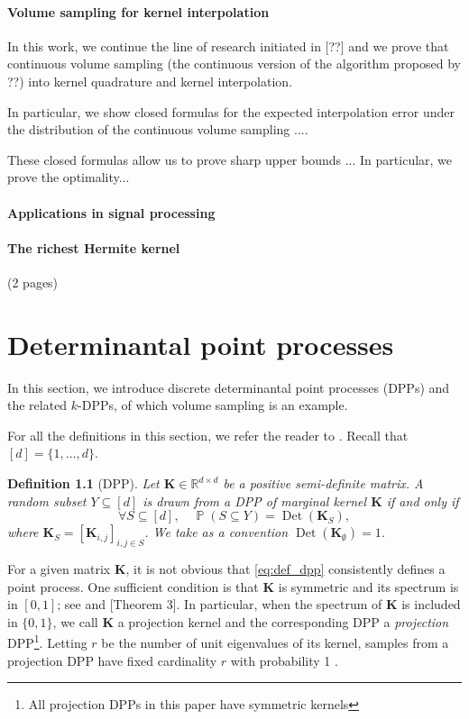\documentclass[twoside,11pt]{book}
\newtheorem{definition}{Definition}
\DeclareMathOperator{\Det}{Det}
\DeclareMathOperator{\Prb}{\mathbb{P}}
\begin{document}
\subsubsection{Volume sampling for kernel interpolation}
In this work, we continue the line of research initiated in [??] and we prove that continuous volume sampling (the continuous version of the algorithm proposed by ??) into kernel quadrature and kernel interpolation.

In particular, we show closed formulas for the expected interpolation error under the distribution of the continuous volume sampling ....

These closed formulas allow us to prove sharp upper bounds ... In particular, we prove the optimality...

\subsubsection{Applications in signal processing}
\subsubsection{The richest Hermite kernel}
(2 pages)

\clearpage
\chapter{Determinantal point processes}

In this section, we introduce discrete determinantal point processes (DPPs) and the related $k$-DPPs, of which volume sampling is an example. 


For all the definitions in this section, we refer the reader to \citep{KuTa12}. Recall that $[d] = \{1,\dots,d\}$.%
\begin{definition}[DPP]
Let $\bm{K} \in \mathbb{R}^{d\times d}$ be a positive semi-definite matrix.
A random subset $Y \subseteq [d]$ is drawn from a DPP of marginal kernel $\bm{K}$ if and only if
\begin{equation}\label{eq:def_dpp}
\forall S \subseteq [d],\quad \Prb(S \subseteq Y) = \Det(\bm{K}_{S}),
\end{equation}
where $\bm{K}_{S} = [\bm{K}_{i,j}]_{i,j \in S}$. We take as a convention $\Det(\bm{K}_{\emptyset}) = 1$.
\end{definition}
For a given matrix $\bm{K}$, it is not obvious that \eqref{eq:def_dpp} consistently defines a point process. One sufficient condition is that $\bm{K}$ is symmetric and its spectrum is in $[0,1]$; see \citep{Mac75} and \citep{Sos00}[Theorem 3]. In particular, when the spectrum of $\bm{K}$ is included in $\{0,1\}$, we call $\bm{K}$ a projection kernel and the corresponding DPP a \emph{projection} DPP\footnote{All projection DPPs in this paper have symmetric kernels}. Letting $r$ be the number of unit eigenvalues of its kernel, samples from a projection DPP have fixed cardinality $r$ with probability 1 \cite*[Lemma 17]{HoKrPeVi06}.
\end{document}
